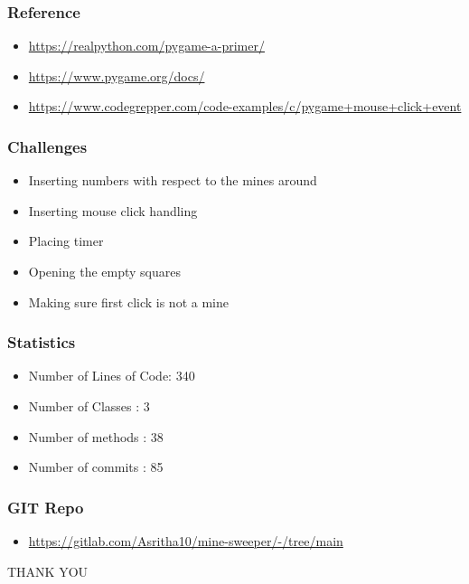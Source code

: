 \documentclass[14pt]{beamer}
\begin{document}
 \begin{frame}
        \frametitle{Reference}
	\begin{itemize}
	    \item  \url{https://realpython.com/pygame-a-primer/}
	     \item \url{https://www.pygame.org/docs/}
	      \item \url{https://www.codegrepper.com/code-examples/c/pygame+mouse+click+event}
	\end{itemize}
    \end{frame}
    \begin{frame}
	\frametitle{Challenges}
        \begin{itemize}
	     \item Inserting numbers with respect to the mines around
	     \item Inserting mouse click handling
	     \item Placing timer
	     \item Opening the empty squares
	     \item Making sure first click is not a mine
        \end{itemize}
    \end{frame}
    \begin{frame}
	\frametitle{Statistics}
        \begin{itemize}
	     \item Number of Lines of Code: 340
	     \item Number of Classes : 3
	     \item Number of methods : 38
	     \item Number of commits : 85
        \end{itemize}
    \end{frame}
  \begin{frame}
	\frametitle{GIT Repo}
	\begin{itemize}
		\item \url{https://gitlab.com/Asritha10/mine-sweeper/-/tree/main} 
	\end{itemize}
    \end{frame}
    \begin{frame}
	\begin{center}
	     THANK YOU
	\end{center}
    \end{frame}
\end{document}
